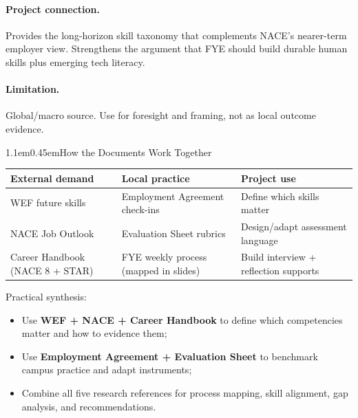 \documentclass[11pt,letterpaper]{article}
\makeatletter
\renewcommand\section{\@startsection{section}{1}{\z@}%
  {1.1em}{0.45em}{\large\bfseries}}
\makeatother
\begin{document}
\paragraph{Project connection.}
Provides the long-horizon skill taxonomy that complements NACE's nearer-term employer view. Strengthens the argument that FYE should build durable human skills plus emerging tech literacy.

\paragraph{Limitation.}
Global/macro source. Use for foresight and framing, not as local outcome evidence.

\section{How the Documents Work Together}

\begin{center}
\renewcommand{\arraystretch}{1.15}
\begin{tabularx}{\textwidth}{>{\raggedright\arraybackslash}p{} >{\raggedright\arraybackslash}p{} >{\raggedright\arraybackslash}X}
\toprule
\textbf{External demand} & \textbf{Local practice} & \textbf{Project use} \\
\midrule
WEF future skills & Employment Agreement check-ins & Define which skills matter \\
NACE Job Outlook & Evaluation Sheet rubrics & Design/adapt assessment language \\
Career Handbook (NACE 8 + STAR) & FYE weekly process (mapped in slides) & Build interview + reflection supports \\
\bottomrule
\end{tabularx}
\end{center}

\vspace{0.4em}
Practical synthesis:
\begin{itemize}
  \item Use \textbf{WEF + NACE + Career Handbook} to define which competencies matter and how to evidence them;
  \item Use \textbf{Employment Agreement + Evaluation Sheet} to benchmark campus practice and adapt instruments;
  \item Combine all five research references for process mapping, skill alignment, gap analysis, and recommendations.
\end{itemize}
\end{document}
